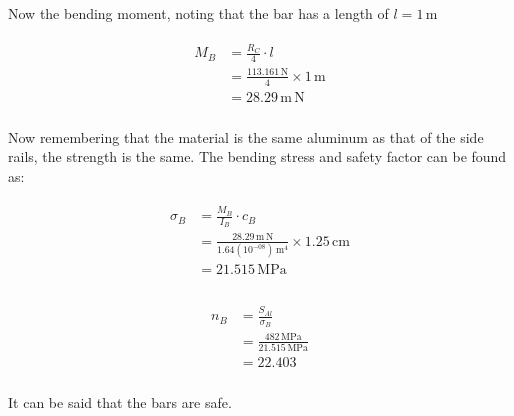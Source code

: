 \documentclass{article}
\begin{document}
Now the bending moment, noting that the bar has a length of $l = 1\,\mathrm{m}$

\begin{align}
\begin{split}
M_{B}	&= \frac{R_{C}}{4} \cdot l\\
		&= \frac{113.161\,\mathrm{N}}{4} \times 1\,\mathrm{m}\\
		&= 28.29\,\mathrm{m \, N}\\
\end{split}
\end{align}

Now remembering that the material is the same aluminum as that of the side rails, the
strength is the same. The bending stress and safety factor can be found as:

\begin{align}
\begin{split}
\sigma_{B}	&= \frac{M_{B}}{I_{B}} \cdot c_{B}\\
			&= \frac{28.29\,\mathrm{m \, N}}{1.64(10^{-08})\,\mathrm{m^{4}}} \times 1.25\,\mathrm{cm}\\
			&= 21.515\,\mathrm{MPa}\\
\end{split}
\end{align}

\begin{align}
\begin{split}
n_{B}	&= \frac{S_{Al}}{\sigma_{B}}\\
		&= \frac{482\,\mathrm{MPa}}{21.515\,\mathrm{MPa}}\\
		&= 22.403\\
\end{split}
\end{align}

It can be said that the bars are safe.
\end{document}
